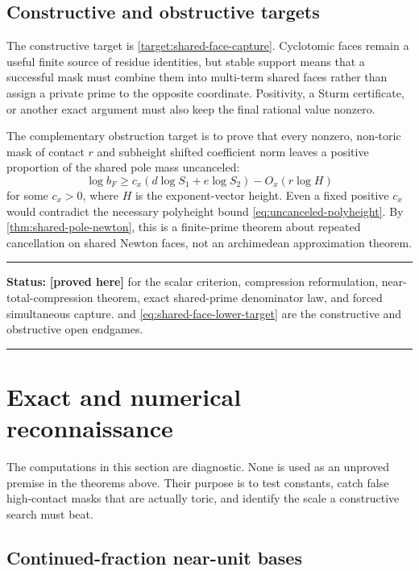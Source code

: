 \documentclass[11pt,oneside]{article}
\theoremstyle{definition}
\theoremstyle{remark}
\newcommand{\statusproved}{\textcolor{provedgreen}{\textbf{[proved here]}}}
\newenvironment{statusbox}[1]
{\begin{center}\begin{minipage}{0.94\textwidth}\raggedright\hrule\vspace{0.45em}
\textbf{Status:} #1\par\vspace{0.35em}}
{\vspace{0.35em}\hrule\end{minipage}\end{center}}
\begin{document}
\subsection{Constructive and obstructive targets}

The constructive target is \cref{target:shared-face-capture}.  Cyclotomic faces remain a
useful finite source of residue identities, but stable support means that a successful mask
must combine them into multi-term shared faces rather than assign a private prime to the
opposite coordinate.  Positivity, a Sturm certificate, or another exact argument must also
keep the final rational value nonzero.

The complementary obstruction target is to prove that every nonzero, non-toric mask of
contact $r$ and subheight shifted coefficient norm leaves a positive proportion of the
shared pole mass uncanceled:
\begin{equation}
 \log b_F\ge c_x(d\log S_1+e\log S_2)-O_x(r\log H)
 \label{eq:shared-face-lower-target}
\end{equation}
for some $c_x>0$, where $H$ is the exponent-vector height.  Even a fixed positive $c_x$
would contradict the necessary polyheight bound \eqref{eq:uncanceled-polyheight}.  By
\cref{thm:shared-pole-newton}, this is a finite-prime theorem about repeated cancellation on
shared Newton faces, not an archimedean approximation theorem.

\begin{statusbox}{\statusproved{} for the scalar criterion, compression reformulation,
near-total-compression theorem, exact shared-prime denominator law, and forced simultaneous
capture.  \Cref{target:shared-face-capture} and \eqref{eq:shared-face-lower-target} are the
constructive and obstructive open endgames.}
\end{statusbox}

\section{Exact and numerical reconnaissance}
\label{sec:reconnaissance}

The computations in this section are diagnostic.  None is used as an unproved premise in the
theorems above.  Their purpose is to test constants, catch false high-contact masks that are
actually toric, and identify the scale a constructive search must beat.

\subsection{Continued-fraction near-unit bases}
\end{document}
